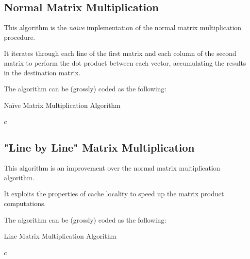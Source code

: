 \documentclass[11pt,a4paper]{article}
\begin{document}
\subsection{Normal Matrix Multiplication}

This algorithm is the \emph{naïve} implementation of the normal matrix multiplication procedure.

It iterates through each line of the first matrix and each column of the second matrix to perform the dot product between each vector, accumulating the results in the destination matrix.

The algorithm can be (grossly) coded as the following:

\begin{algorithm}[H]
    \caption{Naïve Matrix Multiplication Algorithm}
    \begin{algorithmic}[1]
                    \EndFor
                \EndFor
            \EndFor
            \State \Return $c$
        \EndFunction
    \end{algorithmic}
\end{algorithm}

\subsection{"Line by Line" Matrix Multiplication}

This algorithm is an improvement over the normal matrix multiplication algorithm.

It exploits the properties of cache locality to speed up the matrix product computations.

The algorithm can be (grossly) coded as the following:
\begin{algorithm}[H]
    \caption{Line Matrix Multiplication Algorithm}
    \begin{algorithmic}[1]
                    \EndFor
                \EndFor
            \EndFor
            \State \Return $c$
        \EndFunction
    \end{algorithmic}
\end{algorithm}
\end{document}
